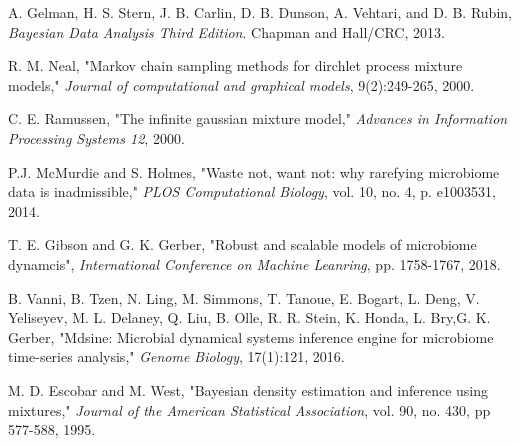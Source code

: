 \documentclass{article}
\begin{document}

\begin{thebibliography}{}
	A. Gelman, H. S. Stern, J. B. Carlin, D. B. Dunson, A. Vehtari, and D. B. Rubin, \textit{Bayesian Data Analysis Third Edition}. Chapman and Hall/CRC, 2013.

	R. M. Neal, "Markov chain sampling methods for dirchlet process mixture models," \textit{Journal of computational and graphical models}, 9(2):249-265, 2000.

	C. E. Ramussen, "The infinite gaussian mixture model," \textit{Advances in Information Processing Systems 12}, 2000.

  P.J. McMurdie and S. Holmes, "Waste not, want not: why rarefying microbiome data is inadmissible," \textit{PLOS Computational Biology}, vol. 10, no. 4, p. e1003531, 2014.

  T. E. Gibson and G. K. Gerber, "Robust and scalable models of microbiome dynamcis", \textit{International Conference on Machine Leanring}, pp. 1758-1767, 2018.

  B. Vanni, B. Tzen, N. Ling, M. Simmons, T. Tanoue, E. Bogart, L. Deng, V. Yeliseyev, M. L. Delaney, Q. Liu, B. Olle, R. R. Stein, K. Honda, L. Bry,G. K. Gerber, "Mdsine: Microbial dynamical systems inference engine for microbiome time-series analysis," \textit{Genome Biology}, 17(1):121, 2016.

  M. D. Escobar and M. West, "Bayesian density estimation and inference using mixtures," \textit{Journal of the American Statistical Association}, vol. 90, no. 430, pp 577-588, 1995.

\end{thebibliography}
\end{document}
